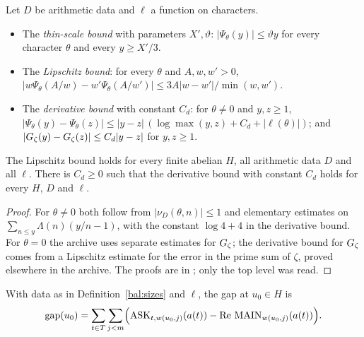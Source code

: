 \begin{definition}\label{bal:scales}
Let $D$ be arithmetic data and $\ell$ a function on characters.
\begin{itemize}
\item The \emph{thin-scale bound} with parameters $X',\vartheta$: $|\Psi_{\theta}(y)|\le\vartheta y$ for every character $\theta$ and every $y\ge X'/3$.
\item The \emph{Lipschitz bound}: for every $\theta$ and $A,w,w'>0$,
$|w\Psi_{\theta}(A/w)-w'\Psi_{\theta}(A/w')|\le 3A|w-w'|/\min(w,w')$.
\item The \emph{derivative bound} with constant $C_d$: for $\theta\ne0$ and $y,z\ge1$,
$|\Psi_{\theta}(y)-\Psi_{\theta}(z)|\le|y-z|\,(\log\max(y,z)+C_d+|\ell(\theta)|)$; and $|\Gz(y)-\Gz(z)|\le C_d|y-z|$ for $y,z\ge1$.
\end{itemize}
\end{definition}

\begin{lemma}\label{bal:scales-hold}
The Lipschitz bound holds for every finite abelian $H$, all arithmetic data $D$ and all $\ell$. There is $C_d\ge0$ such that the derivative bound with constant $C_d$ holds for every $H$, $D$ and $\ell$.
\end{lemma}
\begin{proof}
For $\theta\ne0$ both follow from $|\nu_D(\theta,n)|\le1$ and elementary estimates on $\sum_{n\le y}\Lambda(n)(y/n-1)$, with the constant $\log4+4$ in the derivative bound. For $\theta=0$ the archive uses separate estimates for $\Gz$; the derivative bound for $\Gz$ comes from a Lipschitz estimate for the error in the prime sum of $\zeta$, proved elsewhere in the archive. The proofs are in ; only the top level was read.
\end{proof}

\begin{definition}\label{bal:gap}
With data as in Definition~\ref{bal:sizes} and $\ell$, the gap at $u_0\in H$ is
\[\mathrm{gap}(u_0)=\sum_{t\in T}\sum_{j<m}\Bigl(\mathrm{ASK}_{t,w(u_0,j)}(a(t))-\Re\,\mathrm{MAIN}_{w(u_0,j)}(a(t))\Bigr).\]
\end{definition}

